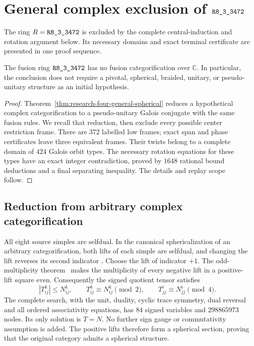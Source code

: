 \section{General complex exclusion of \texorpdfstring{$\sha{R8_3_3472}$}{R8-3-3472}}
\label{sec:r3472-focus}
The ring $R=\sha{R8_3_3472}$ is excluded by the complete
central-induction and rotation argument below. Its necessary domains
and exact terminal certificate are presented in one proof sequence.

\begin{theorem}\label{thm:r3472-general-exclusion}
The fusion ring $\sha{R8_3_3472}$ has no fusion categorification over
$\mathbb C$. In particular, the conclusion does not require a pivotal,
spherical, braided, unitary, or pseudo-unitary structure as an initial
hypothesis.
\end{theorem}
\begin{proof}
Theorem~\ref{thm:research-four-general-spherical} reduces a hypothetical
complex categorification to a pseudo-unitary Galois conjugate with the
same fusion rules. We recall that reduction, then exclude every possible
center restriction frame. There are $372$ labelled low frames; exact
span and phase certificates leave three equivalent frames. Their twists
belong to a complete domain of $424$ Galois orbit types. The necessary
rotation equations for these types have an exact integer contradiction,
proved by $1648$ rational bound deductions and a final separating
inequality. The details and replay scope follow.
\end{proof}

\subsection{Reduction from arbitrary complex categorification}
\label{subsec:r3472-exclusion-scope}
All eight source simples are selfdual. In the canonical sphericalization
of an arbitrary categorification, both lifts of each simple are selfdual,
and changing the lift reverses its second indicator
\cite[Section~5.1]{OstrikPiv3}. Choose the lift of indicator $+1$.
The odd-multiplicity theorem~\cite[Theorem~3.9]{LPRV} makes the
multiplicity of every negative lift in a positive-lift square even.
Consequently the signed quotient tensor satisfies
\[
 |T_{ij}^k|\leq N_{ij}^k,\qquad
 T_{ij}^k\equiv N_{ij}^k\pmod2,\qquad
 T_{jj}^i\equiv N_{jj}^i\pmod4.
\]
The complete search, with the unit, duality, cyclic trace symmetry,
dual reversal and all ordered associativity equations, has $84$ signed
variables and $298865973$ nodes. Its only solution is $T=N$.
No further sign gauge or commutativity assumption is added. The positive
lifts therefore form a spherical section, proving that the original
category admits a spherical structure.

